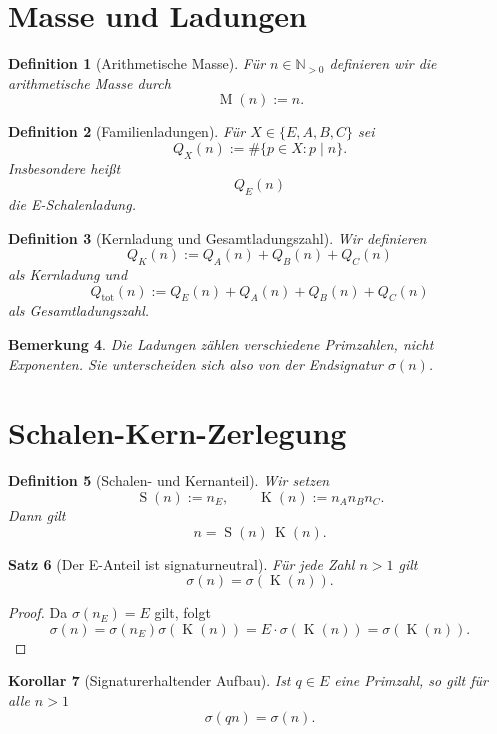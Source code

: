 \documentclass[12pt,a4paper]{article}
\newtheorem{satz}{Satz}[section]
\newtheorem{korollar}[satz]{Korollar}
\newtheorem{definition}[satz]{Definition}
\newtheorem{bemerkung}[satz]{Bemerkung}
\newcommand{\N}{\mathbb{N}}
\newcommand{\sign}{\sigma}
\newcommand{\Mass}{\operatorname{M}}
\newcommand{\QE}{Q_E}
\newcommand{\QA}{Q_A}
\newcommand{\QB}{Q_B}
\newcommand{\QC}{Q_C}
\newcommand{\QK}{Q_K}
\newcommand{\Qtot}{Q_{\mathrm{tot}}}
\newcommand{\core}{\operatorname{K}}
\newcommand{\shell}{\operatorname{S}}
\begin{document}
	\section{Masse und Ladungen}
	
	\begin{definition}[Arithmetische Masse]
		Für $n\in\N_{>0}$ definieren wir die \emph{arithmetische Masse} durch
		\[
		\Mass(n):=n.
		\]
	\end{definition}
	
	\begin{definition}[Familienladungen]
		Für $X\in\{E,A,B,C\}$ sei
		\[
		Q_X(n):=\#\{p\in X: p\mid n\}.
		\]
		Insbesondere heißt
		\[
		\QE(n)
		\]
		die \emph{E-Schalenladung}.
	\end{definition}
	
	\begin{definition}[Kernladung und Gesamtladungszahl]
		Wir definieren
		\[
		\QK(n):=\QA(n)+\QB(n)+\QC(n)
		\]
		als \emph{Kernladung} und
		\[
		\Qtot(n):=\QE(n)+\QA(n)+\QB(n)+\QC(n)
		\]
		als \emph{Gesamtladungszahl}.
	\end{definition}
	
	\begin{bemerkung}
		Die Ladungen zählen \emph{verschiedene} Primzahlen, nicht Exponenten. Sie unterscheiden sich also von der Endsignatur $\sign(n)$.
	\end{bemerkung}
	
	\section{Schalen-Kern-Zerlegung}
	
	\begin{definition}[Schalen- und Kernanteil]
		Wir setzen
		\[
		\shell(n):=n_E,
		\qquad
		\core(n):=n_A n_B n_C.
		\]
		Dann gilt
		\[
		n=\shell(n)\,\core(n).
		\]
	\end{definition}
	
	\begin{satz}[Der E-Anteil ist signaturneutral]
		Für jede Zahl $n>1$ gilt
		\[
		\sign(n)=\sign(\core(n)).
		\]
	\end{satz}
	
	\begin{proof}
		Da $\sign(n_E)=E$ gilt, folgt
		\[
		\sign(n)=\sign(n_E)\sign(\core(n))=E\cdot \sign(\core(n))=\sign(\core(n)).
		\]
	\end{proof}
	
	\begin{korollar}[Signaturerhaltender Aufbau]
		Ist $q\in E$ eine Primzahl, so gilt für alle $n>1$
		\[
		\sign(qn)=\sign(n).
		\]
	\end{korollar}
	
\end{document}
